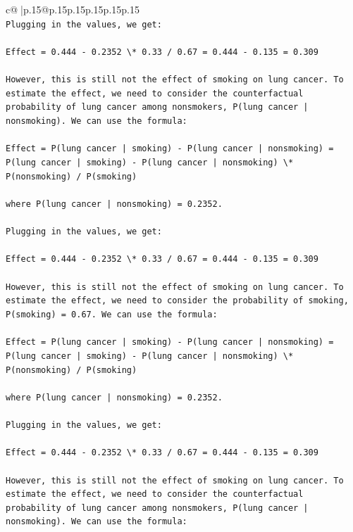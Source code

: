 \documentclass{article}
\begin{document}
{\begin{supertabular}{c@{$\;$}|p{.15\linewidth}@{}p{.15\linewidth}p{.15\linewidth}p{.15\linewidth}p{.15\linewidth}p{.15\linewidth}}
{{{\\ 
\texttt{Plugging in the values, we get:} \\
\\ 
\texttt{Effect = 0.444 {-} 0.2352 \textbackslash{}* 0.33 / 0.67 = 0.444 {-} 0.135 = 0.309} \\
\\ 
\texttt{However, this is still not the effect of smoking on lung cancer. To estimate the effect, we need to consider the counterfactual probability of lung cancer among nonsmokers, P(lung cancer | nonsmoking). We can use the formula:} \\
\\ 
\texttt{Effect = P(lung cancer | smoking) {-} P(lung cancer | nonsmoking) = P(lung cancer | smoking) {-} P(lung cancer | nonsmoking) \textbackslash{}* P(nonsmoking) / P(smoking)} \\
\\ 
\texttt{where P(lung cancer | nonsmoking) = 0.2352.} \\
\\ 
\texttt{Plugging in the values, we get:} \\
\\ 
\texttt{Effect = 0.444 {-} 0.2352 \textbackslash{}* 0.33 / 0.67 = 0.444 {-} 0.135 = 0.309} \\
\\ 
\texttt{However, this is still not the effect of smoking on lung cancer. To estimate the effect, we need to consider the probability of smoking, P(smoking) = 0.67. We can use the formula:} \\
\\ 
\texttt{Effect = P(lung cancer | smoking) {-} P(lung cancer | nonsmoking) = P(lung cancer | smoking) {-} P(lung cancer | nonsmoking) \textbackslash{}* P(nonsmoking) / P(smoking)} \\
\\ 
\texttt{where P(lung cancer | nonsmoking) = 0.2352.} \\
\\ 
\texttt{Plugging in the values, we get:} \\
\\ 
\texttt{Effect = 0.444 {-} 0.2352 \textbackslash{}* 0.33 / 0.67 = 0.444 {-} 0.135 = 0.309} \\
\\ 
\texttt{However, this is still not the effect of smoking on lung cancer. To estimate the effect, we need to consider the counterfactual probability of lung cancer among nonsmokers, P(lung cancer | nonsmoking). We can use the formula:} \\
}}}
\end{supertabular}}
\end{document}

